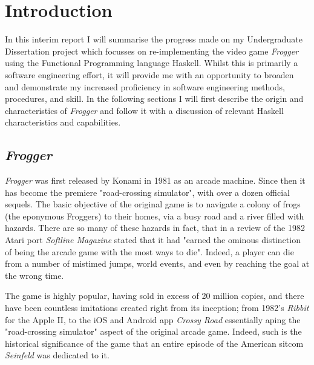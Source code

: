 \documentclass[12pt, a4paper]{report}
\begin{document}
\maketitle

\tableofcontents
\pagebreak

\section{Introduction}
In this interim report I will summarise the progress made on my Undergraduate Dissertation project which focusses on re-implementing the video game \textit{Frogger} using the Functional Programming language Haskell.
Whilst this is primarily a software engineering effort, it will provide me with an opportunity to broaden and demonstrate my increased proficiency in software engineering methods, procedures, and skill.
In the following sections I will first describe the origin and characteristics of \textit{Frogger} and follow it with a discussion of relevant Haskell characteristics and capabilities.

\subsection{\textit{Frogger}}
\textit{Frogger} was first released by Konami in 1981 as an arcade machine.
Since then it has become the premiere "road-crossing simulator", with over a dozen official sequels.
The basic objective of the original game is to navigate a colony of frogs (the eponymous Froggers) to their homes, via a busy road and a river filled with hazards.
There are so many of these hazards in fact, that in a review of the 1982 Atari port \textit{Softline Magazine} stated that it had "earned the ominous distinction of being the arcade game with the most ways to die"\cite{softline}. Indeed, a player can die from a number of mistimed jumps, world events, and even by reaching the goal at the wrong time.

\par

The game is highly popular, having sold in excess of 20 million copies\cite{konamipressrelease}, and there have been countless imitations created right from its inception; from 1982's \textit{Ribbit} for the Apple II, to the iOS and Android app \textit{Crossy Road} essentially aping the "road-crossing simulator" aspect of the original arcade game.
Indeed, such is the historical significance of the game that an entire episode of the American sitcom \textit{Seinfeld} was dedicated to it\cite{seinfeld}.
\end{document}
